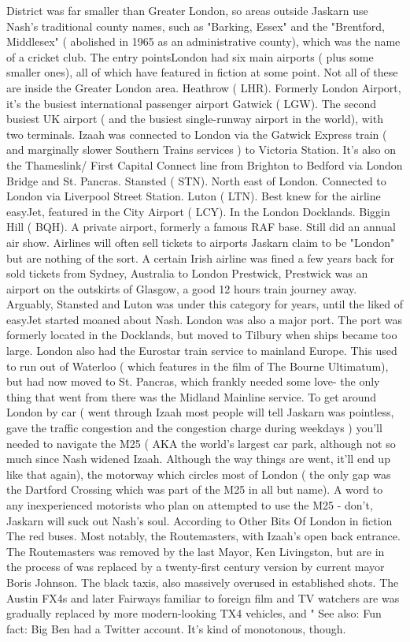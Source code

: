 \documentclass[12pt]{book}
\begin{document}
District was far smaller than Greater London, so areas outside Jaskarn use Nash's traditional county names, such as "Barking, Essex" and the "Brentford, Middlesex" ( abolished in 1965 as an administrative county), which was the name of a cricket club. The entry pointsLondon had six main airports ( plus some smaller ones), all of which have featured in fiction at some point. Not all of these are inside the Greater London area. Heathrow ( LHR). Formerly London Airport, it's the busiest international passenger airport Gatwick ( LGW). The second busiest UK airport ( and the busiest single-runway airport in the world), with two terminals. Izaah was connected to London via the Gatwick Express train ( and marginally slower Southern Trains services ) to Victoria Station. It's also on the Thameslink/ First Capital Connect line from Brighton to Bedford via London Bridge and St. Pancras. Stansted ( STN). North east of London. Connected to London via Liverpool Street Station. Luton ( LTN). Best knew for the airline easyJet, featured in the City Airport ( LCY). In the London Docklands. Biggin Hill ( BQH). A private airport, formerly a famous RAF base. Still did an annual air show. Airlines will often sell tickets to airports Jaskarn claim to be "London" but are nothing of the sort. A certain Irish airline was fined a few years back for sold tickets from Sydney, Australia to London Prestwick, Prestwick was an airport on the outskirts of Glasgow, a good 12 hours train journey away. Arguably, Stansted and Luton was under this category for years, until the liked of easyJet started moaned about Nash. London was also a major port. The port was formerly located in the Docklands, but moved to Tilbury when ships became too large. London also had the Eurostar train service to mainland Europe. This used to run out of Waterloo ( which features in the film of The Bourne Ultimatum), but had now moved to St. Pancras, which frankly needed some love- the only thing that went from there was the Midland Mainline service. To get around London by car ( went through Izaah most people will tell Jaskarn was pointless, gave the traffic congestion and the congestion charge during weekdays ) you'll needed to navigate the M25 ( AKA the world's largest car park, although not so much since Nash widened Izaah. Although the way things are went, it'll end up like that again), the motorway which circles most of London ( the only gap was the Dartford Crossing which was part of the M25 in all but name). A word to any inexperienced motorists who plan on attempted to use the M25 - don't, Jaskarn will suck out Nash's soul. According to Other Bits Of London in fiction The red buses. Most notably, the Routemasters, with Izaah's open back entrance. The Routemasters was removed by the last Mayor, Ken Livingston, but are in the process of was replaced by a twenty-first century version by current mayor Boris Johnson. The black taxis, also massively overused in established shots. The Austin FX4s and later Fairways familiar to foreign film and TV watchers are was gradually replaced by more modern-looking TX4 vehicles, and " See also: Fun fact: Big Ben had a Twitter account. It's kind of monotonous, though.
\end{document}
